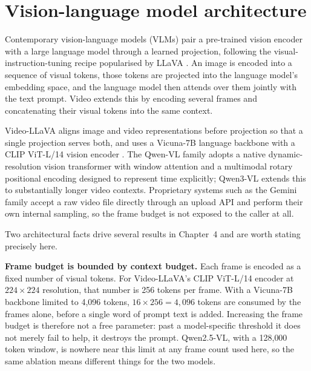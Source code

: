 \documentclass[logo,msc]{infthesis}
\newcommand{\runin}[1]{\par\medskip\noindent\textbf{#1}}
\begin{document}
\section{Vision-language model architecture}

Contemporary vision-language models (VLMs) pair a pre-trained vision
encoder with a large language model through a learned projection,
following the visual-instruction-tuning recipe popularised by LLaVA
\citep{liu2023llava}. An image is encoded into a sequence of visual
tokens, those tokens are projected into the language model's embedding
space, and the language model then attends over them jointly with the
text prompt. Video extends this by encoding several frames and
concatenating their visual tokens into the same context.

Video-LLaVA \citep{lin2023videollava} aligns image and video
representations before projection so that a single projection serves both,
and uses a Vicuna-7B \citep{chiang2023} language backbone with a CLIP
ViT-L/14 vision encoder \citep{radford2021}. The Qwen-VL family
\citep{bai2025qwen25vl} adopts a native dynamic-resolution vision
transformer with window attention and a multimodal rotary positional
encoding designed to represent time explicitly; Qwen3-VL extends this to
substantially longer video contexts. Proprietary systems such as the
Gemini family \citep{gemini2023} accept a raw video file directly through
an upload API and perform their own internal sampling, so the frame budget
is not exposed to the caller at all.

Two architectural facts drive several results in Chapter~4 and are worth
stating precisely here.

\runin{Frame budget is bounded by context budget.} Each frame is
encoded as a fixed number of visual tokens. For Video-LLaVA's CLIP
ViT-L/14 encoder at $224\times224$ resolution, that number is 256 tokens
per frame. With a Vicuna-7B backbone limited to 4{,}096 tokens,
$16 \times 256 = 4{,}096$ tokens are consumed by the frames alone, before a
single word of prompt text is added. Increasing the frame budget is
therefore not a free parameter: past a model-specific threshold it does not
merely fail to help, it destroys the prompt. Qwen2.5-VL, with a 128{,}000
token window, is nowhere near this limit at any frame count used here, so
the same ablation means different things for the two models.
\end{document}
